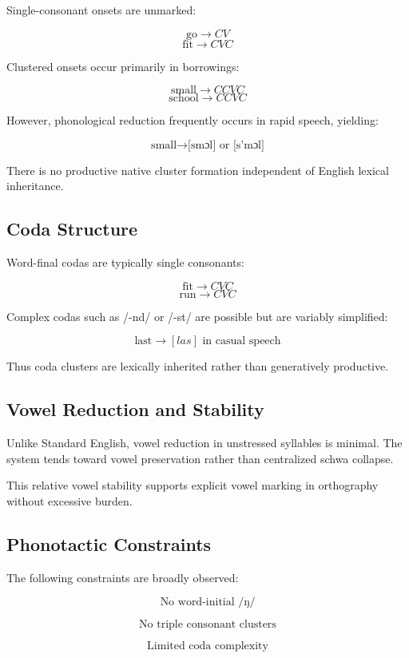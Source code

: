 \documentclass[12pt]{article}
\begin{document}
Single-consonant onsets are unmarked:

\[
\text{go} \rightarrow CV
\]
\[
\text{fit} \rightarrow CVC
\]

Clustered onsets occur primarily in borrowings:

\[
\text{small} \rightarrow CCVC
\]
\[
\text{school} \rightarrow CCVC
\]

However, phonological reduction frequently occurs in rapid speech, yielding:

\[
\text{small} \rightarrow \text{[smɔl] or [s'mɔl]}
\]

There is no productive native cluster formation independent of English lexical inheritance.

\subsection{Coda Structure}

Word-final codas are typically single consonants:

\[
\text{fit} \rightarrow CVC
\]
\[
\text{run} \rightarrow CVC
\]

Complex codas such as /-nd/ or /-st/ are possible but are variably simplified:

\[
\text{last} \rightarrow [las] \text{ in casual speech}
\]

Thus coda clusters are lexically inherited rather than generatively productive.

\subsection{Vowel Reduction and Stability}

Unlike Standard English, vowel reduction in unstressed syllables is minimal. The system tends toward vowel preservation rather than centralized schwa collapse.

This relative vowel stability supports explicit vowel marking in orthography without excessive burden.

\subsection{Phonotactic Constraints}

The following constraints are broadly observed:

\[
\text{No word-initial } /ŋ/
\]

\[
\text{No triple consonant clusters}
\]

\[
\text{Limited coda complexity}
\]
\end{document}
